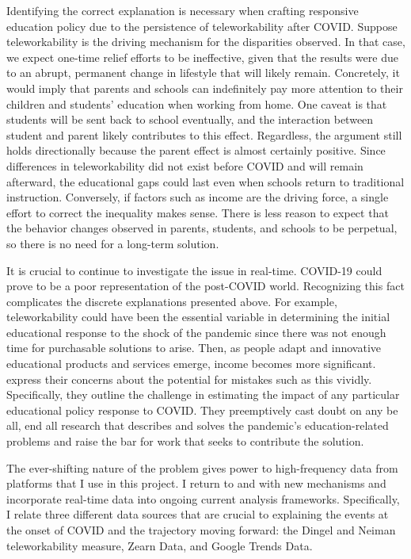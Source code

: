 Identifying the correct explanation is necessary when crafting responsive education policy due to the persistence of teleworkability after COVID.
Suppose teleworkability is the driving mechanism for the disparities observed.
In that case, we expect one-time relief efforts to be ineffective, given that the results were due to an abrupt, permanent change in lifestyle that will likely remain.
Concretely, it would imply that parents and schools can indefinitely pay more attention to their children and students’ education when working from home.
One caveat is that students will be sent back to school eventually,
and the interaction between student and parent likely contributes to this effect.
Regardless, the argument still holds directionally because the parent effect is almost certainly positive.
Since differences in teleworkability did not exist before COVID and will remain afterward, the educational gaps could last even when schools return to traditional instruction.
Conversely, if factors such as income are the driving force, a single effort to correct the inequality makes sense.
There is less reason to expect that the behavior changes observed in parents, students, and schools to be perpetual, so there is no need for a long-term solution.

It is crucial to continue to investigate the issue in real-time.
COVID-19 could prove to be a poor representation of the post-COVID world.
Recognizing this fact complicates the discrete explanations presented above.
For example, teleworkability could have been the essential variable in determining the initial educational response to the shock of the pandemic since there was not enough time for purchasable solutions to arise.
Then, as people adapt and innovative educational products and services emerge, income becomes more significant.
\cite{bh2} express their concerns about the potential for mistakes such as this vividly.
Specifically, they outline the challenge in estimating the impact of any particular educational policy response to COVID.
They preemptively cast doubt on any be all, end all research that describes and solves the pandemic’s education-related problems and raise the bar for work that seeks to contribute the solution.

The ever-shifting nature of the problem gives power to high-frequency data from platforms that I use in this project.
I return to \citep{bh1} and \citep{chetty} with new mechanisms and incorporate real-time data into ongoing current analysis frameworks.
Specifically, I relate three different data sources that are crucial to explaining the events at the onset of COVID and the trajectory moving forward: the Dingel and Neiman teleworkability measure, Zearn Data, and Google Trends Data.
\fi
